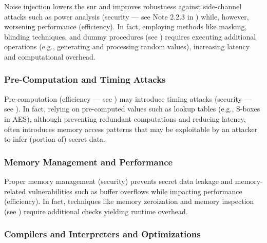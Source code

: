 Noise injection lowers the \gls{snr} and improves robustness against side-channel attacks such as power analysis (security --- see Note 2.2.3 in ) while, however, worsening performance (efficiency). In fact, employing methods like masking, blinding techniques, and dummy procedures (see ) requires executing additional operations (e.g., generating and processing random values), increasing latency and computational overhead.


\subsubsection{Pre-Computation and Timing Attacks}\label{sec:security_of_cryptographic_algorithms:trade_offs:pre_computation_and_timing_attacks}

Pre-computation (efficiency --- see ) may introduce timing attacks (security --- see ). In fact, relying on pre-computed values such as lookup tables (e.g., S-boxes in AES), although preventing redundant computations and reducing latency, often introduces memory access patterns that may be exploitable by an attacker to infer (portion of) secret data.


\subsubsection{Memory Management and Performance}\label{sec:security_of_cryptographic_algorithms:trade_offs:memory_management_and_performance}

Proper memory management (security) prevents secret data leakage and memory-related vulnerabilities such as buffer overflows while impacting performance (efficiency). In fact, techniques like memory zeroization and memory inspection (see ) require additional checks yielding runtime overhead.


\subsubsection{Compilers and Interpreters and Optimizations}\label{sec:security_of_cryptographic_algorithms:trade_offs:compilers_and_interpreters_and_optimizations}

